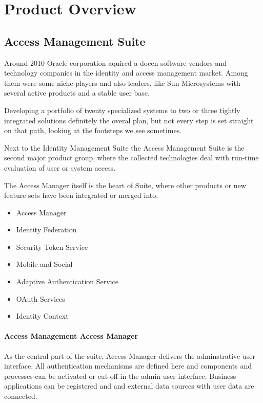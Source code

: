 
\section[Product Overview]{Product Overview}

\subsection{Access Management Suite}

Around 2010 Oracle corporation aquired a docen software vendors and
technology companies in the identity and access management market. Among
them were some niche players and also leaders, like Sun Microsystems
with several active products and a stable user base.

Developing a portfolio of twenty specialized systems to two or three
tightly integrated solutions definitely the overal plan, but not every
step is set straight on that path, looking at the footsteps we see
sometimes.

Next to the Identity Management Suite the Access Management Suite is the
second major product group, where the collected technologies deal with
run-time evaluation of user or system access.

The Access Manager itself is the heart of Suite, where other products or
new feature sets have been integrated or merged into.

\begin{itemize}
    \item Access Manager
    \item Identity Federation
    \item Security Token Service
    \item Mobile and Social
    \item Adaptive Authentication Service
    \item OAuth Services
    \item Identity Context
\end{itemize}


\paragraph{Access Management Access Manager}

As the central part of the suite, Access Manager delivers the
adminstrative user interface. All authentication mechanisms are defined
here and components and processes can be activated or cut-off in the
admin user interface. Business applications can be registered and and
external data sources with user data are connected.

